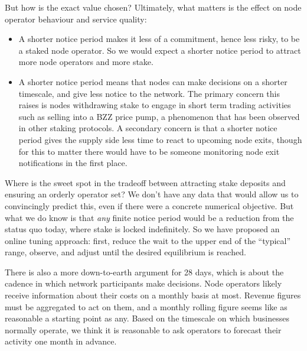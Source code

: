 But how is the exact value chosen? 
%
Ultimately, what matters is the effect on node operator behaviour and service quality:
%
\begin{itemize}
  \item 
    A shorter notice period makes it less of a commitment, hence less risky, to be a staked node operator. 
    So we would expect a shorter notice period to attract more node operators and more stake.
  \item 
    A shorter notice period means that nodes can make decisions on a shorter timescale, and give less notice to the network.
    The primary concern this raises is nodes withdrawing stake to engage in short term trading activities such as selling into a BZZ price pump, a phenomenon that has been observed in other staking protocols.
    A secondary concern is that a shorter notice period gives the supply side less time to react to upcoming node exits, though for this to matter there would have to be someone monitoring node exit notifications in the first place.
\end{itemize}

Where is the sweet spot in the tradeoff between attracting stake deposits and ensuring an orderly operator set? 
%
We don't have any data that would allow us to convincingly predict this, even if there were a concrete numerical objective. 
%
But what we do know is that \emph{any} finite notice period would be a reduction from the status quo today, where stake is locked indefinitely.
%
So we have proposed an online tuning approach: first, reduce the wait to the upper end of the ``typical'' range, observe, and adjust until the desired equilibrium is reached.

There is also a more down-to-earth argument for 28 days, which is about the cadence in which network participants make decisions.
%
Node operators likely receive information about their costs on a monthly basis at most.
%
Revenue figures must be aggregated to act on them, and a monthly rolling figure seems like as reasonable a starting point as any.
%
Based on the timescale on which businesses normally operate, we think it is reasonable to ask operators to forecast their activity one month in advance.
